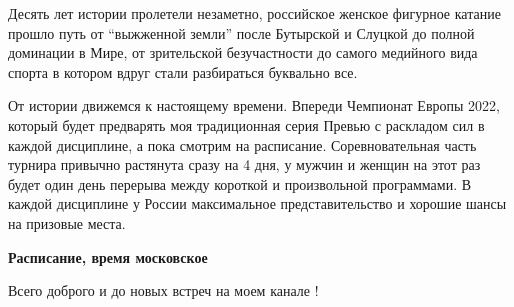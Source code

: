 Десять лет истории пролетели незаметно, российское женское фигурное катание
прошло путь от \enquote{выжженной земли} после Бутырской и Слуцкой до полной доминации
в Мире, от зрительской безучастности до самого медийного вида спорта в котором
вдруг стали разбираться буквально все.

От истории движемся к настоящему времени. Впереди Чемпионат Европы 2022,
который будет предварять моя традиционная серия Превью с раскладом сил в каждой
дисциплине, а пока смотрим на расписание. Соревновательная часть турнира
привычно растянута сразу на 4 дня, у мужчин и женщин на этот раз будет один
день перерыва между короткой и произвольной программами. В каждой дисциплине у
России максимальное представительство и хорошие шансы на призовые места.

\textbf{Расписание, время московское}


Всего доброго и до новых встреч на моем канале !
